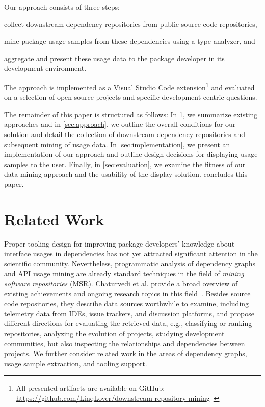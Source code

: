 \documentclass[a4paper,twoside]{article}
\begin{document}
Our approach consists of three steps:
\begin{enumerate*}[label=(\roman*)]
	\item collect downstream dependency repositories from public source code repositories,
	\item mine package usage samples from these dependencies using a type analyzer,
	and \item aggregate and present these usage data to the package developer in its development environment.
\end{enumerate*}
The approach is implemented as a Visual Studio Code extension\footnote{All presented artifacts are available on GitHub: \href{https://github.com/LinqLover/downstream-repository-mining}{https://github.com/LinqLover/downstream-repository-mining}~\cite{thiede2022dowdep}} and evaluated on a selection of open source projects and specific development-centric questions.

The remainder of this paper is structured as follows:
In \cref{sec:related_work}, we summarize existing approaches and in \cref{sec:approach}, we outline the overall conditions for our solution and detail the collection of downstream dependency repositories and subsequent mining of usage data.
In \cref{sec:implementation}, we present an implementation of our approach and outline design decisions for displaying usage samples to the user.
Finally, in \cref{sec:evaluation}, we examine the fitness of our data mining approach and the usability of the display solution.
 concludes this paper.




\section{Related Work}
\label{sec:related_work}
%
Proper tooling design for improving package developers' knowledge about interface usages in dependencies has not yet attracted significant attention in the scientific community.
Nevertheless, programmatic analysis of dependency graphs and API usage mining are already standard techniques in the field of \emph{mining software repositories} (MSR).
Chaturvedi et al. provide a broad overview of existing achievements and ongoing research topics in this field~\cite{chaturvedi2013tools}.
Besides source code repositories, they describe data sources worthwhile to examine, including telemetry data from IDEs, issue trackers, and discussion platforms, and propose different directions for evaluating the retrieved data, e.g., classifying or ranking repositories, analyzing the evolution of projects, studying development communities, but also inspecting the relationships and dependencies between projects.
We further consider related work in the areas of dependency graphs, usage sample extraction, and tooling support.
\end{document}
